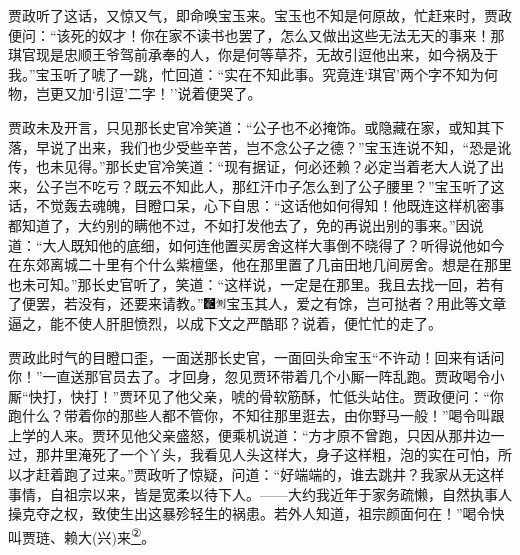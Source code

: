 贾政听了这话，又惊又气，即命唤宝玉来。宝玉也不知是何原故，忙赶来时，贾政便问：``该死的奴才！你在家不读书也罢了，怎么又做出这些无法无天的事来！那琪官现是忠顺王爷驾前承奉的人，你是何等草芥，无故引逗他出来，如今祸及于我。''宝玉听了唬了一跳，忙回道：``实在不知此事。究竟连`琪官'两个字不知为何物，岂更又加`引逗'二字！''说着便哭了。

贾政未及开言，只见那长史官冷笑道：``公子也不必掩饰。或隐藏在家，或知其下落，早说了出来，我们也少受些辛苦，岂不念公子之德？''宝玉连说不知，``恐是讹传，也未见得。''那长史官冷笑道：``现有据证，何必还赖？必定当着老大人说了出来，公子岂不吃亏？既云不知此人，那红汗巾子怎么到了公子腰里？''宝玉听了这话，不觉轰去魂魄，目瞪口呆，心下自思：``这话他如何得知！他既连这样机密事都知道了，大约别的瞒他不过，不如打发他去了，免的再说出别的事来。''因说道：``大人既知他的底细，如何连他置买房舍这样大事倒不晓得了？听得说他如今在东郊离城二十里有个什么紫檀堡，他在那里置了几亩田地几间房舍。想是在那里也未可知。''那长史官听了，笑道：``这样说，一定是在那里。我且去找一回，若有了便罢，若没有，还要来请教。''{\includegraphics[width=3mm]{../Images/00006}\includegraphics[width=3mm]{../Images/00011}\footnotesize \kaishu 宝玉其人，爱之有馀，岂可挞者？用此等文章逼之，能不使人肝胆愤烈，以成下文之严酷耶？}说着，便忙忙的走了。

贾政此时气的目瞪口歪，一面送那长史官，一面回头命宝玉``不许动！回来有话问你！''一直送那官员去了。才回身，忽见贾环带着几个小厮一阵乱跑。贾政喝令小厮``快打，快打！''贾环见了他父亲，唬的骨软筋酥，忙低头站住。贾政便问：``你跑什么？带着你的那些人都不管你，不知往那里逛去，由你野马一般！''喝令叫跟上学的人来。贾环见他父亲盛怒，便乘机说道：``方才原不曾跑，只因从那井边一过，那井里淹死了一个丫头，我看见人头这样大，身子这样粗，泡的实在可怕，所以才赶着跑了过来。''贾政听了惊疑，问道：``好端端的，谁去跳井？我家从无这样事情，自祖宗以来，皆是宽柔以待下人。------大约我近年于家务疏懒，自然执事人操克夺之权，致使生出这暴殄轻生的祸患。若外人知道，祖宗颜面何在！''喝令快叫贾琏、赖大{{(兴)}}来\href{../Text/part0037_split_000.html\#lnkback_2_a}{\textsuperscript{②}}。

